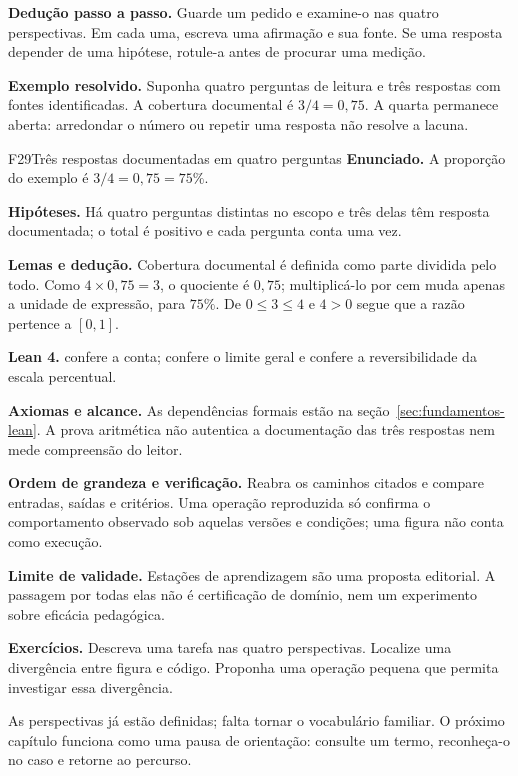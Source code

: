 \begin{metodo}
\textbf{Dedução passo a passo.} Guarde um pedido e examine-o nas quatro perspectivas. Em cada uma, escreva uma afirmação e sua fonte. Se uma resposta depender de uma hipótese, rotule-a antes de procurar uma medição.
\end{metodo}

\begin{resultado}
\textbf{Exemplo resolvido.} Suponha quatro perguntas de leitura e três respostas com fontes identificadas. A cobertura documental é $3/4=0{,}75$. A quarta permanece aberta: arredondar o número ou repetir uma resposta não resolve a lacuna.
\end{resultado}

\begin{formalizacao}{F29}{Três respostas documentadas em quatro perguntas}
\textbf{Enunciado.} A proporção do exemplo é $3/4=0{,}75=75\%$.

\textbf{Hipóteses.} Há quatro perguntas distintas no escopo e três delas têm resposta documentada; o total é positivo e cada pergunta conta uma vez.

\textbf{Lemas e dedução.} Cobertura documental é definida como parte dividida pelo todo. Como $4\times0{,}75=3$, o quociente é $0{,}75$; multiplicá-lo por cem muda apenas a unidade de expressão, para $75\%$. De $0\leq3\leq4$ e $4>0$ segue que a razão pertence a $[0,1]$.

\textbf{Lean 4.}  confere a conta;  confere o limite geral e  confere a reversibilidade da escala percentual.

\textbf{Axiomas e alcance.} As dependências formais estão na seção~\ref{sec:fundamentos-lean}. A prova aritmética não autentica a documentação das três respostas nem mede compreensão do leitor.
\end{formalizacao}

\begin{resultado}
\textbf{Ordem de grandeza e verificação.} Reabra os caminhos citados e compare entradas, saídas e critérios. Uma operação reproduzida só confirma o comportamento observado sob aquelas versões e condições; uma figura não conta como execução.
\end{resultado}

\begin{aviso}
\textbf{Limite de validade.} Estações de aprendizagem são uma proposta editorial. A passagem por todas elas não é certificação de domínio, nem um experimento sobre eficácia pedagógica.
\end{aviso}

\begin{resultado}
\textbf{Exercícios.} Descreva uma tarefa nas quatro perspectivas. Localize uma divergência entre figura e código. Proponha uma operação pequena que permita investigar essa divergência.
\end{resultado}

As perspectivas já estão definidas; falta tornar o vocabulário familiar. O próximo capítulo funciona como uma pausa de orientação: consulte um termo, reconheça-o no caso e retorne ao percurso.
